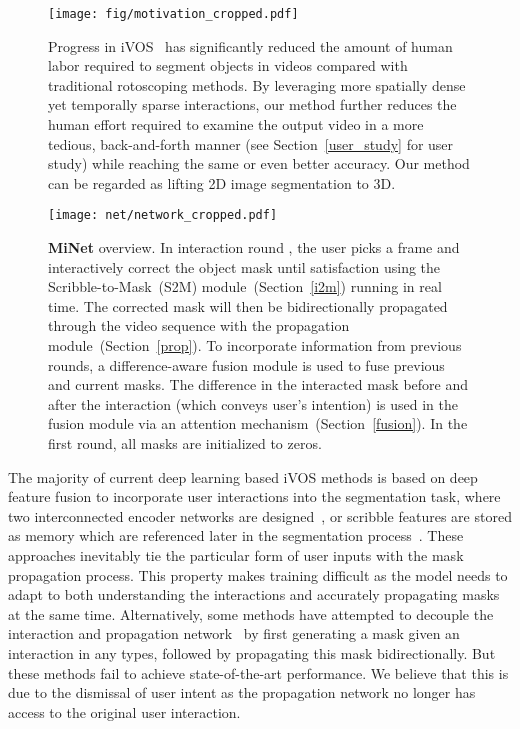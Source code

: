 \documentclass[final]{cvpr}
\begin{document}
	\begin{figure}[t]
		\begin{center}
			\texttt{[image: fig/motivation\_cropped.pdf]}
		\end{center}
		\vspace{-0.15in}
		\caption{
			Progress in iVOS~\cite{Caelles_arXiv_2019} has significantly reduced the amount of human labor required to segment objects in videos compared with traditional rotoscoping methods. By leveraging more spatially dense yet temporally sparse interactions, our method further reduces the human effort required to examine the output video in a more tedious, back-and-forth manner (see Section~\ref{user_study} for user study) while reaching the same or even better accuracy. Our method can be regarded as lifting 2D image segmentation to 3D.
		}
		\label{fig:motivation}
		\vspace{-0.15in}
	\end{figure}
	
	\begin{figure*}[t]
		\texttt{[image: net/network\_cropped.pdf]}
		\vspace{-0.15in}
		\caption{\textbf{MiNet} overview. 
			In interaction round , the user picks a frame  and interactively correct the object mask until satisfaction using the Scribble-to-Mask~(S2M) module~(Section~\ref{i2m}) running in real time. 
			The corrected mask will then be bidirectionally propagated through the video sequence with the propagation module~(Section~\ref{prop}).
			To incorporate information from previous rounds, a difference-aware fusion module is used to fuse previous and current masks. The difference in the interacted mask before and after the interaction (which conveys user's intention) is used in the fusion module via an attention mechanism~(Section~\ref{fusion}). In the first round, all masks are initialized to zeros.}
		\label{fig:overview}
		\vspace{-0.15in}
	\end{figure*}
	
	The majority of current deep learning based iVOS methods is based on deep feature fusion to incorporate user interactions into the segmentation task, where two interconnected encoder networks are designed~\cite{oh2019fastInteractive, heo2019interactiveSDINet,Yuk2020IVOSGlobalLocal}, or scribble features are stored as memory which are referenced later in the segmentation process~\cite{miao2020memoryAggregationInteractive, Chen2020WorkshopCFBI, oh2020STMPAMI}. These approaches inevitably tie the particular form of user inputs with the mask propagation process. This property makes training difficult as the model needs to adapt to both understanding the interactions and accurately propagating masks at the same time. 
	Alternatively, some methods have attempted to decouple the interaction and propagation network~\cite{benard2017interactiveInTheWild, Tran2020WorkshopMultiple} by first generating a mask given an interaction in any types, followed by propagating this mask bidirectionally. But these methods fail to achieve state-of-the-art performance. We believe that this is due to the dismissal of user intent as the propagation network no longer has access to the original user interaction.
	
\end{document}
